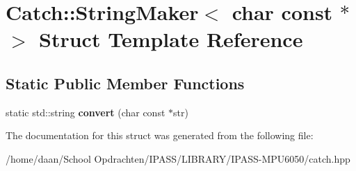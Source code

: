 \hypertarget{structCatch_1_1StringMaker_3_01char_01const_01_5_01_4}{}\section{Catch\+:\+:String\+Maker$<$ char const $\ast$ $>$ Struct Template Reference}
\label{structCatch_1_1StringMaker_3_01char_01const_01_5_01_4}
\subsection*{Static Public Member Functions}
\begin{DoxyCompactItemize}
\item 
\mbox{\label{structCatch_1_1StringMaker_3_01char_01const_01_5_01_4_a20813965ad59cdf6d1f874f47158432d}} 
static std\+::string {\bfseries convert} (char const $\ast$str)
\end{DoxyCompactItemize}


The documentation for this struct was generated from the following file\+:\begin{DoxyCompactItemize}
\item 
/home/daan/\+School Opdrachten/\+I\+P\+A\+S\+S/\+L\+I\+B\+R\+A\+R\+Y/\+I\+P\+A\+S\+S-\/\+M\+P\+U6050/catch.\+hpp\end{DoxyCompactItemize}
